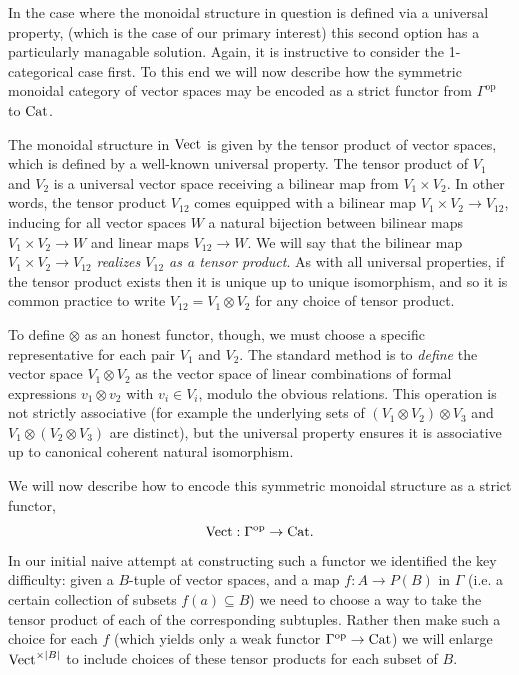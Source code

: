 \documentclass{amsart}
\begin{document}
In the case where the monoidal structure in question is defined via a universal property, (which is the case of our primary interest) this second option has a particularly managable solution. Again, it is instructive to consider the 1-categorical case first. To this end we will now describe how the symmetric monoidal category of vector spaces may be encoded as a strict functor from $\Gamma^\text{op}$ to $\mathrm{Cat}$. 

The monoidal structure in $\mathrm{Vect}$ is given by the tensor product of vector spaces, which is defined by a well-known universal property. The tensor product of $V_1$ and $ V_2$ is a universal vector space receiving a bilinear map from $V_1 \times V_2$. In other words, the tensor product $V_{12}$ comes equipped with a bilinear map  $V_1 \times V_2 \to V_{12}$, inducing for all vector spaces $W$ a natural bijection between bilinear maps $V_1 \times V_2 \to W$ and linear maps $V_{12} \to W$. We will say that the bilinear map  $V_1 \times V_2 \to V_{12}$ {\em realizes $V_{12}$ as a tensor product}. As with all universal properties, if the tensor product exists then it is unique up to unique isomorphism, and so it is common practice to write $V_{12} = V_1 \otimes V_2$ for any choice of tensor product.

To define $\otimes$ as an honest functor, though, we must choose a specific representative for each pair $V_1$ and $V_2$. The standard method is to {\em define} the vector space $V_1 \otimes V_2$ as the vector space of linear combinations of formal expressions $v_1 \otimes v_2$ with $v_i \in V_i$, modulo the obvious relations. This operation is not strictly associative (for example the underlying sets of $(V_1 \otimes V_2) \otimes V_3$ and $V_1 \otimes (V_2 \otimes V_3)$ are distinct), but the universal property ensures it is associative up to canonical coherent natural isomorphism.

We will now describe how to encode this symmetric monoidal structure as a strict functor,
\begin{equation*}
	\mathrm{Vect}: \Gamma^\text{op} \to \mathrm{Cat}.
\end{equation*}  
In our initial naive attempt at constructing such a functor we identified the key difficulty: given a $B$-tuple of vector spaces, and a map $f: A \to P(B)$ in $\Gamma$ (i.e. a certain collection of subsets $f(a) \subseteq B$) we need to choose a way to take the tensor product of each of the corresponding subtuples. Rather then make such a choice for each $f$ (which yields only a weak functor $\Gamma^\text{op} \to \mathrm{Cat}$) we will enlarge $\mathrm{Vect}^{\times |B|}$ to include choices of these tensor products for each subset of $B$. 
\end{document}
